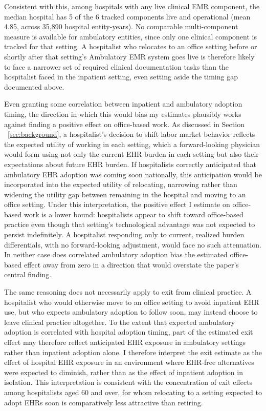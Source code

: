 \documentclass[12pt]{article}
\begin{document}
Consistent with this, among hospitals with any live clinical EMR component, the
median hospital has 5 of the 6 tracked components live and operational (mean
4.85, across 35,890 hospital entity-years). No comparable multi-component measure
is available for ambulatory entities, since only one clinical component is
tracked for that setting. A hospitalist who relocates to an office setting before
or shortly after that setting's Ambulatory EMR system goes live is therefore
likely to face a narrower set of required clinical documentation tasks than the
hospitalist faced in the inpatient setting, even setting aside the timing gap
documented above.
  
Even granting some correlation between inpatient and ambulatory adoption timing,
the direction in which this would bias my estimates  plausibly works against finding a positive effect on office-based work. As discussed in Section ~\ref{sec:background}, a
hospitalist's decision to shift labor market behavior reflects the expected utility of
working in each setting, which a forward-looking physician would form using not
only the current EHR burden in each setting but also their expectations about
future EHR burden. If hospitalists correctly anticipated that ambulatory EHR
adoption was coming soon nationally, this anticipation would be incorporated into the expected
utility of relocating, narrowing rather than widening the utility gap between
remaining in the hospital and moving to an office setting. Under this interpretation, the positive effect I estimate on office-based work is a lower bound: hospitalists appear to shift toward office-based practice even though
that setting's technological advantage was not expected to persist indefinitely.
A hospitalist responding only to current, realized burden differentials, with no
forward-looking adjustment, would face no such attenuation. In neither case does
correlated ambulatory adoption bias the estimated office-based effect away from zero in a
direction that would overstate the paper's central finding.

The same reasoning does not necessarily apply to exit from clinical practice. A hospitalist who would otherwise move to an office setting to avoid inpatient EHR use, but who expects ambulatory adoption to follow soon, may instead choose to leave clinical practice altogether. To the extent that expected ambulatory adoption is correlated with hospital adoption timing, part of the estimated exit effect may therefore reflect anticipated EHR exposure in ambulatory settings rather than inpatient adoption alone. I therefore interpret the exit estimate as the effect of hospital EHR exposure in an environment where EHR-free alternatives were expected to diminish, rather than as the effect of inpatient adoption in isolation. This interpretation is consistent with the concentration of exit effects among hospitalists aged 60 and over, for whom relocating to a setting expected to adopt EHRs soon is comparatively less attractive than retiring.
\end{document}
